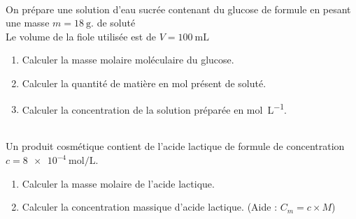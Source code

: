 \documentclass[11pt,a4paper]{article}
\begin{document}
\dotfill 

\vspace{8mm}
\dotfill 

\vspace{8mm}
\dotfill 

\vspace{8mm}
\dotfill 
\vspace{8mm}

 \\[3mm]

On prépare une solution d'eau sucrée contenant du glucose de formule  en pesant une masse $m=\SI{18}{\gram}$. de soluté\\
Le volume de la fiole utilisée est de $V=\SI{100}{\milli\liter}$

\begin{enumerate}
\item Calculer la masse molaire moléculaire du glucose.

\vspace{5mm}
\dotfill 

\item Calculer la quantité de matière en \si{\mol} présent de soluté.

\vspace{5mm}
\dotfill 


\item Calculer la concentration de la solution préparée en \si{\mol\per\liter}.

\vspace{5mm}
\dotfill 

\end{enumerate}


\vspace{0.2cm}

 \\[3mm] 

Un produit cosmétique contient de l'acide lactique de formule de concentration $c=\SI{8e-4}{\mol\per\liter}$.\\

\begin{enumerate}
\item Calculer la masse molaire de l'acide lactique.


\vspace{5mm}
\dotfill 

\item Calculer la concentration massique d'acide lactique. (Aide : $C_m= c \times M$) 


\vspace{5mm}
\dotfill 

\end{enumerate}
\end{document}
